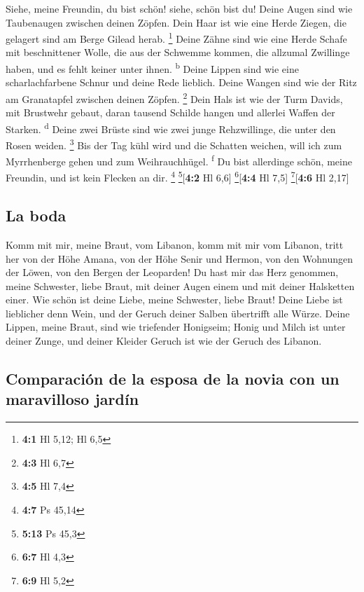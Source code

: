  Siehe, meine Freundin, du bist schön! siehe, schön bist
du! Deine Augen sind wie Taubenaugen zwischen deinen Zöpfen. Dein Haar
ist wie eine Herde Ziegen, die gelagert sind am Berge Gilead herab.
\footnote{\textbf{4:1} Hl 5,12; Hl 6,5}  Deine Zähne sind
wie eine Herde Schafe mit beschnittener Wolle, die aus der Schwemme
kommen, die allzumal Zwillinge haben, und es fehlt keiner unter ihnen.
\textsuperscript{b}  Deine Lippen sind wie eine
scharlachfarbene Schnur und deine Rede lieblich. Deine Wangen sind wie
der Ritz am Granatapfel zwischen deinen Zöpfen. \footnote{\textbf{4:3}
  Hl 6,7}  Dein Hals ist wie der Turm Davids, mit
Brustwehr gebaut, daran tausend Schilde hangen und allerlei Waffen der
Starken. \textsuperscript{d}  Deine zwei Brüste sind wie
zwei junge Rehzwillinge, die unter den Rosen weiden. \footnote{\textbf{4:5}
  Hl 7,4}  Bis der Tag kühl wird und die Schatten weichen,
will ich zum Myrrhenberge gehen und zum Weihrauchhügel.
\textsuperscript{f}  Du bist allerdinge schön, meine
Freundin, und ist kein Flecken an dir. \footnote{\textbf{4:7} Ps 45,14}
\footnote{\textbf{5:13} Ps 45,3}{[}\textbf{4:2} Hl 6,6{]}
\footnote{\textbf{6:7} Hl 4,3}{[}\textbf{4:4} Hl 7,5{]}
\footnote{\textbf{6:9} Hl 5,2}{[}\textbf{4:6} Hl 2,17{]}

\hypertarget{la-boda}{%
\subsection{La boda}\label{la-boda}}

 Komm mit mir, meine Braut, vom Libanon, komm mit mir vom
Libanon, tritt her von der Höhe Amana, von der Höhe Senir und Hermon,
von den Wohnungen der Löwen, von den Bergen der Leoparden!
 Du hast mir das Herz genommen, meine Schwester, liebe
Braut, mit deiner Augen einem und mit deiner Halsketten einer.
 Wie schön ist deine Liebe, meine Schwester, liebe Braut!
Deine Liebe ist lieblicher denn Wein, und der Geruch deiner Salben
übertrifft alle Würze.  Deine Lippen, meine Braut, sind
wie triefender Honigseim; Honig und Milch ist unter deiner Zunge, und
deiner Kleider Geruch ist wie der Geruch des Libanon.

\hypertarget{comparaciuxf3n-de-la-esposa-de-la-novia-con-un-maravilloso-jarduxedn}{%
\subsection{Comparación de la esposa de la novia con un maravilloso
jardín}\label{comparaciuxf3n-de-la-esposa-de-la-novia-con-un-maravilloso-jarduxedn}}

